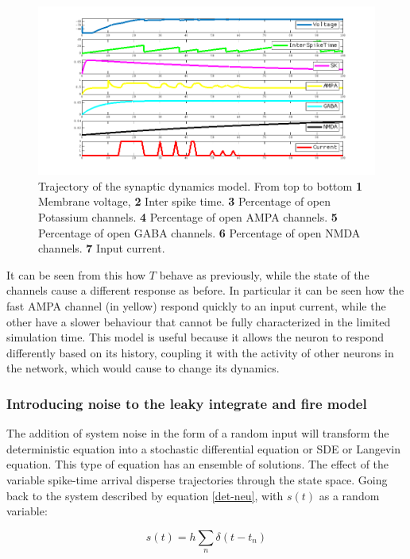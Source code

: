 		\begin{figure}
			\includegraphics[width=\textwidth]{Figures/synapse}
			\caption{Trajectory of the synaptic dynamics model. From top to bottom \textbf{1} Membrane voltage, \textbf{2} Inter spike time. \textbf{3} Percentage of open Potassium channels. \textbf{4} Percentage of open AMPA channels. \textbf{5} Percentage of open GABA channels. \textbf{6} Percentage of open NMDA channels. \textbf{7} Input current.}
			\label{fig:synapse}
		\end{figure}

		It can be seen from this how $T$ behave as previously, while the state of the channels cause a different response as before.
		In particular it can be seen how the fast AMPA channel (in yellow) respond quickly to an input current, while the other have a slower behaviour that cannot be fully characterized in the limited simulation time.
		This model is useful because it allows the neuron to respond differently based on its history, coupling it with the activity of other neurons in the network, which would cause to change its dynamics.

		\subsubsection{Introducing noise to the leaky integrate and fire model}
		The addition of system noise in the form of a random input will transform the deterministic equation into a stochastic differential equation or SDE or Langevin equation.
		This type of equation has an ensemble of solutions.
		The effect of the variable spike-time arrival disperse trajectories through the state space.
		Going back to the system described by equation \ref{det-neu}, with $s(t)$ as a random variable:

		\begin{equation}
			s(t) = h\sum\limits_n\delta(t-t_n)
		\end{equation}

